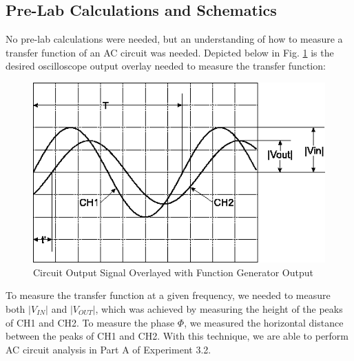 \documentclass[10pt]{article}
\begin{document}
\medskip


\subsection{Pre-Lab Calculations and Schematics}

No pre-lab calculations were needed, but an understanding of how to measure a transfer function of an AC circuit was needed. Depicted below in Fig. \ref{measurement} is the desired oscilloscope output overlay needed to measure the transfer function:
\begin{centering}
	\begin{figure} [H]
		\centering
		\includegraphics[scale=0.5]{images/measurementexample.png}
		\caption{Circuit Output Signal Overlayed with Function Generator Output}
		\label{measurement}
	\end{figure}
\end{centering}

To measure the transfer function at a given frequency, we needed to measure both $|V_{IN}|$ and $|V_{OUT}|$, which was achieved by measuring the height of the peaks of CH1 and CH2. To measure the phase $\Phi$, we measured the horizontal distance between the peaks of CH1 and CH2. With this technique, we are able to perform AC circuit analysis in Part A of Experiment 3.2. 
\medskip

\end{document}

